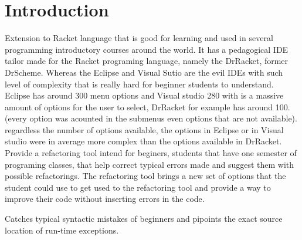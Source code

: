 \section{Introduction}


Extension to Racket language that is good for learning and used in several
programming introductory courses around the world.
It has a pedagogical IDE tailor made for the Racket programing language, namely
the DrRacket, former DrScheme.
Whereas the Eclipse and Visual Sutio are the evil IDEs with such level of
complexity that is really hard for beginner students to understand.
Eclipse has around 300 menu options and Visual studio 280 with is a massive amount
of options for the user to select, DrRacket for example has around 100. (every option was acounted in the submenus
even options that are not available). regardless the number of options available,
the options in Eclipse or in Visual studio were in average more complex than the
options available in DrRacket.
Provide a refactoring tool intend for beginers, students that have one semester
of programing classes, that help correct typical errors made and suggest them
with possible refactorings.
The refactoring tool brings a new set of options that the student could use to
get used to the refactoring tool and provide a way to improve their code without
inserting errors in the code.


Catches typical syntactic mistakes of beginners and pipoints the exact source location
of run-time exceptions.

